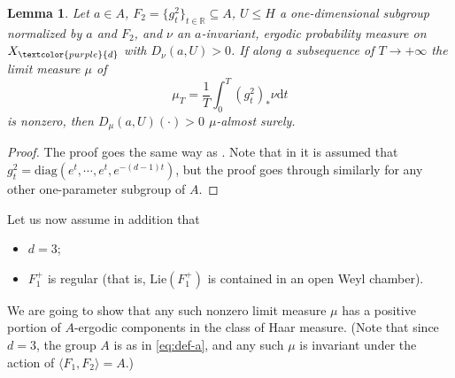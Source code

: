 \documentclass[reqno,12pt]{amsart}
\newtheorem{lemma}[theorem]{Lemma}
\theoremstyle{definition}
\numberwithin{equation}{section}
\newcommand{\RR}{\mathbb{R}}
\newcommand{\diag}{\mathrm{diag}}
\newcommand{\Lie}{\mathrm{Lie}}
\newcommand{\la}{\langle}
\newcommand{\ra}{\rangle}
\newcommand {\comm}[1]   {\textcolor{red}{#1}}
\newcommand {\neww}[1]   {\textcolor{purple}{#1}}
\newcommand {\equ}[1]     {\eqref{eq:#1}}
\begin{document}
{\begin{lemma}\label{L:posentropy}
    Let $a\in A$,   $F_2=\{g_t^2\}_{t\in\RR}\subseteq A$, %
    $U\leq H$  a one-dimensional subgroup normalized by $a$ and $F_2$, and $\nu$   an $a$-invariant, ergodic probability measure on $X_{\neww{d}}$ %
    with $D_{\nu}(a,U)>0$. If along a subsequence of $T\to +\infty$ the limit measure $\mu$ of $$\mu_T=\frac{1}{T}\int_0^T(g^2_t)_*\nu\mathrm{d}t$$ is nonzero, then $D_{\mu}(a,U)(\cdot)>0$ $\mu$-almost surely.
\end{lemma}
\begin{proof}
    The proof goes the same way as \cite[Theorem 3.1]{shi12}.
    Note that in \cite[Theorem 3.1]{shi12} it is assumed that $g^2_t=\diag(e^t,\cdots,e^t,e^{-(d-1)t})$, but the proof goes through similarly for any other one-parameter subgroup of $A$. %
\end{proof}

Let us now assume in addition that
\begin{itemize}
    \item $d=3$;
    \item $F_1^+$ is regular (that is, $\Lie(F_1^+)$ is contained in an open Weyl chamber).
\end{itemize}
We are going to show that any such nonzero limit measure $\mu$ has a positive portion of $A$-ergodic components in the class of Haar measure. {(Note that since $d=3$, {the group $A$ is as in  \equ{def-a}, and any such $\mu$ is invariant under the action of $\la F_1,F_2\ra=A$.})}


}
\end{document}
